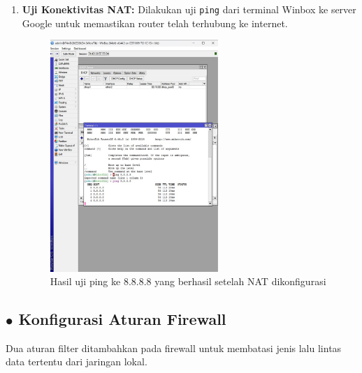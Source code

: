 \begin{enumerate}
    \item \textbf{Uji Konektivitas NAT:} Dilakukan uji \texttt{ping} dari terminal Winbox ke server Google untuk memastikan router telah terhubung ke internet.
    \begin{figure}[H]
        \centering
        \includegraphics[width=0.6\textwidth]{img4/PingTestNat.jpeg}
        \caption{Hasil uji ping ke 8.8.8.8 yang berhasil setelah NAT dikonfigurasi}
    \end{figure}
\end{enumerate}

\subsection*{$\bullet$ Konfigurasi Aturan Firewall}
Dua aturan filter ditambahkan pada firewall untuk membatasi jenis lalu lintas data tertentu dari jaringan lokal.

